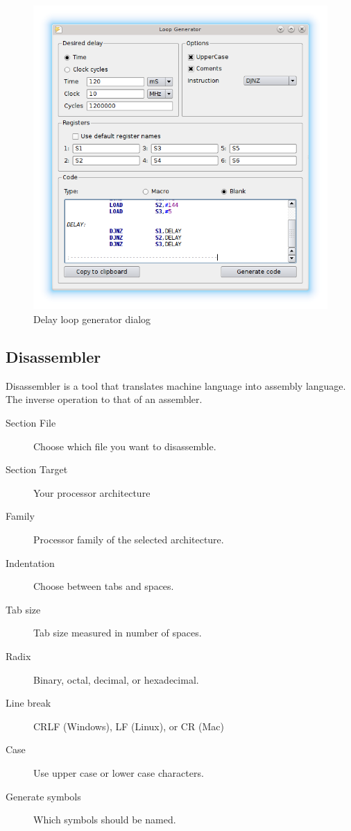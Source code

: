        \begin{figure}[h]
            \centering
            \includegraphics[width=.6\textwidth]{img/loop_gen.png}
            \caption{Delay loop generator dialog}
        \end{figure}

    \clearpage
    \subsection{Disassembler}
        Disassembler is a tool that translates machine language into assembly language. The inverse
        operation to that of an assembler.

        \begin{description}
            \item[Section File] Choose which file you want to disassemble.
            \item[Section Target] Your processor architecture
            \item[Family] Processor family of the selected architecture.
            \item[Indentation] Choose between tabs and spaces.
            \item[Tab size] Tab size measured in number of spaces.
            \item[Radix] Binary, octal, decimal, or hexadecimal.
            \item[Line break] CRLF (Windows), LF (Linux), or CR (Mac)
            \item[Case] Use upper case or lower case characters.
            \item[Generate symbols] Which symbols should be named.
        \end{description}

